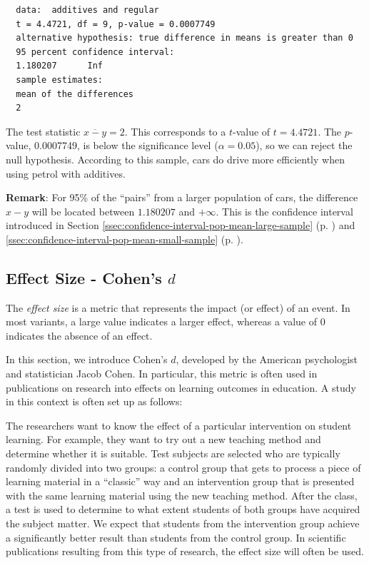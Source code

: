 \begin{example}
\begin{verbatim}
  data:  additives and regular
  t = 4.4721, df = 9, p-value = 0.0007749
  alternative hypothesis: true difference in means is greater than 0
  95 percent confidence interval:
  1.180207      Inf
  sample estimates:
  mean of the differences 
  2 
  \end{verbatim}
  
  The test statistic $\overline{x-y}=2$. This corresponds to a $t$-value of $t=4.4721$.
  The $p$-value, 0.0007749, is below the significance level ($\alpha=0.05$), so we can reject the null hypothesis. According to this sample, cars do drive more efficiently when using petrol with additives.
  
  \textbf{Remark}: For 95\% of the ``pairs'' from a larger population of cars, the difference $x-y$ will be located between $1.180207$ and $+\infty$.
  This is the confidence interval introduced in Section \ref{ssec:confidence-interval-pop-mean-large-sample} (p. \pageref{ssec:confidence-interval-pop-mean-large-sample})
  and \ref{ssec:confidence-interval-pop-mean-small-sample} (p. \pageref{ssec:confidence-interval-pop-mean-small-sample}).
\end{example}


\subsection{Effect Size - Cohen's \texorpdfstring{$d$}{d}}
\label{ssec:cohens-d}

The \emph{effect size} is a metric that represents the impact (or effect) of an event. In most variants, a large value indicates a larger effect, whereas a value of 0 indicates the absence of an effect.

In this section, we introduce Cohen's $d$, developed by the American psychologist and statistician Jacob Cohen. In particular, this metric is often used in publications on research into effects on learning outcomes in education. A study in this context is often set up as follows:

The researchers want to know the effect of a particular intervention on student learning. For example, they want to try out a new teaching method and determine whether it is suitable. Test subjects are selected who are typically randomly divided into two groups: a control group that gets to process a piece of learning material in a ``classic'' way and an intervention group that is presented with the same learning material using the new teaching method. After the class, a test is used to determine to what extent students of both groups have acquired the subject matter. We expect that students from the intervention group achieve a significantly better result than students from the control group. In scientific publications resulting from this type of research, the effect size will often be used.

